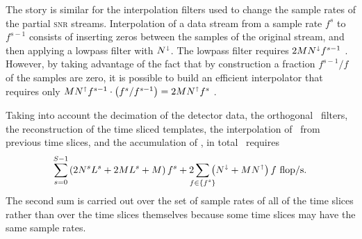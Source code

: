 The story is similar for the interpolation filters used to change the sample rates of the partial \textsc{snr} streams.  Interpolation of a data stream from a sample rate $f^s$ to $f^{s-1}$ consists of inserting zeros between the samples of the original stream, and then applying a lowpass filter with $N^\shortdownarrow$.  The lowpass filter requires $2 M N^\shortdownarrow f^{s-1}$ \flops.  However, by taking advantage of the fact that by construction a fraction $f^{s-1}/f$ of the samples are zero, it is possible to build an efficient interpolator that requires only $M N^\shortuparrow f^{s-1} \cdot \left( f^s / f^{s-1} \right) = 2 M N^\shortuparrow f^s$ \flops.

Taking into account the decimation of the detector data, the orthogonal \fir\ filters, the reconstruction of the time sliced templates, the interpolation of \SNR\ from previous time slices, and the accumulation of \SNR, in total \lloid\ requires
$$
\sum_{\mathclap{s=0}}^{\mathclap{S-1}} \left( 2 \slicessamps \numsvdtmps + 2 \numtmps \numsvdtmps + \numtmps \right) f^s + 2\sum_{\mathclap{f \in \{f^s\}}} \left( N^\shortdownarrow + \numtmps N^\shortuparrow \right) f \textrm{ \flops.}
$$
The second sum is carried out over the set of sample rates of all of the time slices rather than over the time slices themselves because some time slices may have the same sample rates.

